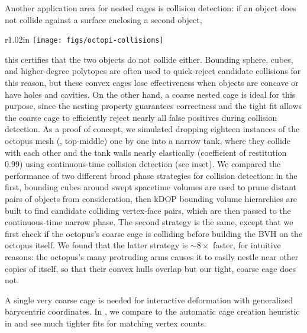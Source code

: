 Another application area for nested cages is collision detection: if an object
does not collide against a surface enclosing a second object, 
%
\begin{wrapfigure}{r}{1.02in}
%
\centering
%
\texttt{[image: figs/octopi-collisions]}
%
\end{wrapfigure}
%
this certifies that the two objects do not collide either. Bounding sphere, cubes, and
higher-degree polytopes are often used to quick-reject candidate collisions for
this reason, but these convex cages lose effectiveness when objects are concave
or have holes and cavities. On the other hand, a coarse nested cage is ideal
for this purpose, since the nesting property guarantees correctness and the
tight fit allows the coarse cage to efficiently reject nearly all false
positives during collision detection. As a proof of concept, we simulated
dropping eighteen instances of the octopus mesh (,
top-middle) one by one into a narrow tank, where they collide with each other
and the tank walls nearly elastically (coefficient of restitution $0.99$) using
continuous-time collision detection (see inset). We compared the performance of
two different broad phase strategies for collision detection: in the first,
bounding cubes around swept spacetime volumes are used to prune distant pairs
of objects from consideration, then kDOP bounding volume hierarchies are built
to find candidate colliding vertex-face pairs, which are then passed to the
continuous-time narrow phase. The second strategy is the same, except
that we first check if the octopus's coarse cage is colliding before building
the BVH on the octopus itself. We found that the latter strategy is 
$\sim 8\times$ faster, for intuitive reasons: the octopus's many
protruding arms causes it to easily nestle near other copies of itself, so that
their convex hulls overlap but our tight, coarse cage does not.

A single very coarse cage is needed for interactive deformation with
generalized barycentric coordinates.
%
In , we compare to the automatic cage creation
heuristic in \cite{Ben-Chen:2009:SDT} and see much tighter fits for matching
vertex counts.

